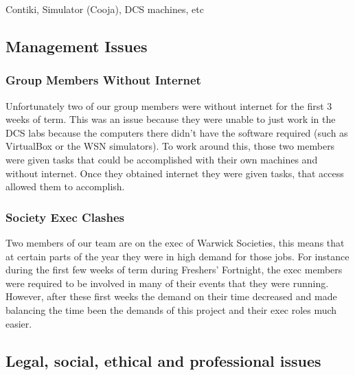 Contiki, Simulator (Cooja), DCS machines, etc 

\subsection{Management Issues}

\subsubsection{Group Members Without Internet}
Unfortunately two of our group members were without internet for the first 3 weeks of term. This was an issue because they were unable to just work in the DCS labs because the computers there didn't have the software required (such as VirtualBox or the WSN simulators). To work around this, those two members were given tasks that could be accomplished with their own machines and without internet. Once they obtained internet they were given tasks, that access allowed them to accomplish.

\subsubsection{Society Exec Clashes}
Two members of our team are on the exec of Warwick Societies, this means that at certain parts of the year they were in high demand for those jobs. For instance during the first few weeks of term during Freshers' Fortnight, the exec members were required to be involved in many of their events that they were running. However, after these first weeks the demand on their time decreased and made balancing the time been the demands of this project and their exec roles much easier.

\subsection{Legal, social, ethical and professional issues}

